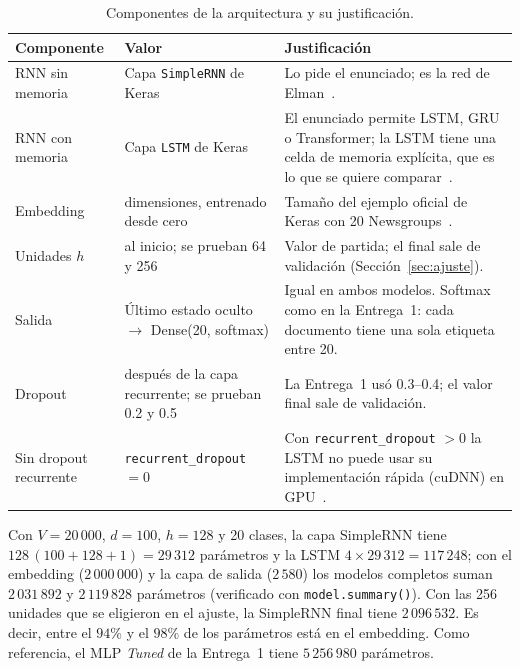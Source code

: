\documentclass[12pt, a4paper]{article}
\begin{document}
\begin{table}[H]
\centering
\caption{Componentes de la arquitectura y su justificación.}
\label{tab:arquitectura}
\small
\begin{tabularx}{\linewidth}{>{\raggedright\arraybackslash}p{3.2cm} >{\raggedright\arraybackslash}p{3.6cm} X}
\toprule
\textbf{Componente} & \textbf{Valor} & \textbf{Justificación} \\
\midrule
RNN sin memoria & Capa \texttt{SimpleRNN} de Keras & Lo pide el enunciado; es la red de Elman~\cite{elman1990}. \\
RNN con memoria & Capa \texttt{LSTM} de Keras & El enunciado permite LSTM, GRU o Transformer; la LSTM tiene una celda de memoria explícita, que es lo que se quiere comparar~\cite{hochreiter1997}. \\
Embedding & 100 dimensiones, entrenado desde cero & Tamaño del ejemplo oficial de Keras con 20 Newsgroups~\cite{kerasglove}. \\
Unidades $h$ & 128 al inicio; se prueban 64 y 256 & Valor de partida; el final sale de validación (Sección~\ref{sec:ajuste}). \\
Salida & Último estado oculto $\rightarrow$ Dense(20, softmax) & Igual en ambos modelos. Softmax como en la Entrega~1: cada documento tiene una sola etiqueta entre 20. \\
Dropout & 0.3 después de la capa recurrente; se prueban 0.2 y 0.5 & La Entrega~1 usó 0.3--0.4; el valor final sale de validación. \\
Sin dropout recurrente & \texttt{recurrent\_dropout} $=0$ & Con \texttt{recurrent\_dropout} $>0$ la LSTM no puede usar su implementación rápida (cuDNN) en GPU~\cite{kerasdocs}. \\
\bottomrule
\end{tabularx}
\end{table}

Con $V=20\,000$, $d=100$, $h=128$ y 20 clases, la capa SimpleRNN tiene $128\,(100+128+1)=29\,312$ parámetros y la LSTM $4\times 29\,312 = 117\,248$; con el embedding ($2\,000\,000$) y la capa de salida ($2\,580$) los modelos completos suman $2\,031\,892$ y $2\,119\,828$ parámetros (verificado con \texttt{model.summary()}). Con las 256 unidades que se eligieron en el ajuste, la SimpleRNN final tiene $2\,096\,532$. Es decir, entre el $94\%$ y el $98\%$ de los parámetros está en el embedding. Como referencia, el MLP \textit{Tuned} de la Entrega~1 tiene $5\,256\,980$ parámetros.

\end{document}
